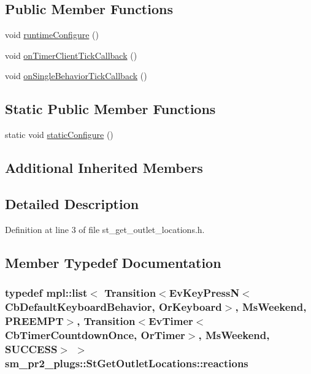 \subsection*{Public Member Functions}
\begin{DoxyCompactItemize}
\item 
void \hyperlink{structsm__pr2__plugs_1_1StGetOutletLocations_ad5b299ff3f4253429690b22f3a81d9cf}{runtime\+Configure} ()
\item 
void \hyperlink{structsm__pr2__plugs_1_1StGetOutletLocations_a46a5f83dd8f5465356ab0652f34c9c52}{on\+Timer\+Client\+Tick\+Callback} ()
\item 
void \hyperlink{structsm__pr2__plugs_1_1StGetOutletLocations_acdde8773e35f30d4c5084903e2fe0259}{on\+Single\+Behavior\+Tick\+Callback} ()
\end{DoxyCompactItemize}
\subsection*{Static Public Member Functions}
\begin{DoxyCompactItemize}
\item 
static void \hyperlink{structsm__pr2__plugs_1_1StGetOutletLocations_ae798350a0b8946793b6bf37e678d1910}{static\+Configure} ()
\end{DoxyCompactItemize}
\subsection*{Additional Inherited Members}


\subsection{Detailed Description}


Definition at line 3 of file st\+\_\+get\+\_\+outlet\+\_\+locations.\+h.



\subsection{Member Typedef Documentation}
\subsubsection[{\texorpdfstring{reactions}{reactions}}]{\setlength{\rightskip}{0pt plus 5cm}typedef mpl\+::list$<$ Transition$<$Ev\+Key\+PressN$<$Cb\+Default\+Keyboard\+Behavior, {\bf Or\+Keyboard}$>$, {\bf Ms\+Weekend}, {\bf P\+R\+E\+E\+M\+PT}$>$, Transition$<$Ev\+Timer$<$Cb\+Timer\+Countdown\+Once, {\bf Or\+Timer}$>$, {\bf Ms\+Weekend}, {\bf S\+U\+C\+C\+E\+SS}$>$ $>$ {\bf sm\+\_\+pr2\+\_\+plugs\+::\+St\+Get\+Outlet\+Locations\+::reactions}}\hypertarget{structsm__pr2__plugs_1_1StGetOutletLocations_a29fe1adf7ea3dc5988b17b08fc8ab1c9}{}\label{structsm__pr2__plugs_1_1StGetOutletLocations_a29fe1adf7ea3dc5988b17b08fc8ab1c9}


